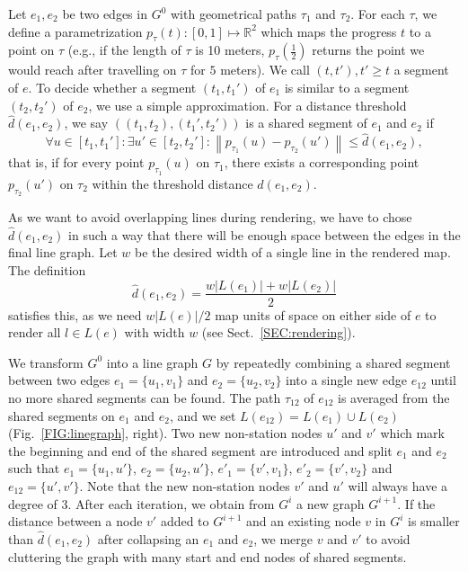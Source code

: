 \documentclass[sigconf]{acmart}
\begin{document}
Let $e_1, e_2$ be two edges in $G^0$ with geometrical paths $\tau_1$ and $\tau_2$. For each $\tau$, we define a parametrization $p_\tau(t): [0,1] \mapsto \mathbb{R}^2$ which maps the progress $t$ to a point on $\tau$ (e.g., if the length of $\tau$ is 10 meters, $p_\tau(\frac{1}{2})$ returns the point we would reach after travelling on $\tau$ for $5$ meters). We call $(t, t'), t' \geq t$ a segment of $e$. To decide whether a segment $(t_1, {t_1}')$ of $e_1$ is similar to a segment $(t_2, {t_2}')$ of $e_2$, we use a simple approximation. For a distance threshold $\hat{d}(e_1, e_2)$, we say $\left(\left(t_1, t_2\right), \left({t_1}', {t_2}'\right)\right)$ is a shared segment of $e_1$ and $e_2$ if
\begin{equation}
	\forall u \in [t_1, {t_1}']: \exists u' \in [t_2, {t_2}']:\left\|p_{\tau_1}(u) - p_{\tau_2}(u')\right\| \leq \hat{d}(e_1, e_2),
\end{equation}
that is, if for every point $p_{\tau_1}(u)$ on $\tau_1$, there exists a corresponding point $p_{\tau_2}(u')$ on $\tau_2$ within the threshold distance $\hat{d}(e_1, e_2)$.

As we want to avoid overlapping lines during rendering, we have to chose $\hat{d}(e_1, e_2)$ in such a way that there will be enough space between the edges in the final line graph. Let $w$ be the desired width of a single line in the rendered map. The definition
\begin{equation}
\hat{d}(e_1, e_2) = \frac{w|L(e_1)| + w|L(e_2)|}{2}
\end{equation}
satisfies this, as we need $w|L(e)| / 2$ map units of space on either side of $e$ to render all $l \in L(e)$ with width $w$ (see Sect.~\ref{SEC:rendering}).

We transform $G^0$ into a line graph $G$ by repeatedly combining a shared segment between two edges $e_1 = \{u_1, v_1\}$ and $e_2 = \{u_2, v_2\}$ into a single new edge $e_{12}$ until no more shared segments can be found. The path $\tau_{12}$ of $e_{12}$ is averaged from the shared segments on $e_1$ and $e_2$, and we set $L(e_{12}) = L(e_1) \cup L(e_2)$ (Fig.~\ref{FIG:linegraph}, right). Two new non-station nodes $u'$ and $v'$ which mark the beginning and end of the shared segment are introduced and split $e_1$ and $e_2$ such that $e_1 = \{u_1, u'\}$, $e_2 = \{u_2, u'\}$, $e'_1 = \{v', v_1\}$, $e'_2 = \{v', v_2\}$ and $e_{12} = \{u', v'\}$. Note that the new non-station nodes $v'$ and $u'$ will always have a degree of 3. After each iteration, we obtain from $G^i$ a new graph $G^{i+1}$. If the distance between a node $v'$ added to $G^{i+1}$ and an existing node $v$ in $G^i$ is smaller than $\hat{d}(e_1, e_2)$ after collapsing an $e_1$ and $e_2$, we merge $v$ and $v'$ to avoid cluttering the graph with many start and end nodes of shared segments. 
\end{document}
